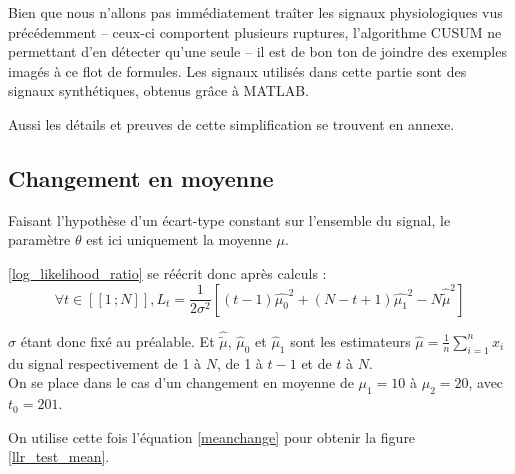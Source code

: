 \documentclass[french,11pt,notitlepage]{report}
\begin{document}
		Bien que nous n'allons pas immédiatement traîter les signaux physiologiques vus précédemment --
	ceux-ci comportent plusieurs ruptures, l'algorithme CUSUM ne permettant d'en détecter qu'une seule -- il est de bon ton de joindre des exemples imagés à ce flot de formules.
	Les signaux utilisés dans cette partie sont des signaux synthétiques, obtenus grâce à MATLAB.
	
		Aussi les détails et preuves de cette simplification se trouvent en annexe.
		
	
	\subsection{Changement en moyenne}
	
	
	Faisant l'hypothèse d'un écart-type constant sur l'ensemble du signal, le paramètre $\theta$ est ici uniquement la moyenne $\mu$.
	
	\ref{log_likelihood_ratio} se réécrit donc après calculs :
	\begin{equation}
		\forall t \in [\![1\,; N]\!], L_t = \frac{1}{2 \sigma ^2}\left[(t-1)\hat{\mu_0}^2 + (N - t + 1)\hat{\mu_1}^2 - N\hat{\tilde\mu}^2 \right]
		\label{meanchange}
	\end{equation}
	
	$\sigma$ étant donc fixé au préalable. Et $\hat{\tilde\mu}$, $\hat\mu_0$ et $\hat\mu_1$ sont les estimateurs $\hat\mu=\frac1n\sum_{i=1}^nx_i$ du signal respectivement de 1 à $N$, de 1 à $t-1$ et de $t$ à $N$.
	\\
	
	On se place dans le cas d'un changement en moyenne de $\mu_1 = 10$ à $\mu_2 = 20$, avec $t_0 = 201$.
	
	On utilise cette fois l'équation \ref{meanchange} pour obtenir la figure \ref{llr_test_mean}.
\end{document}
